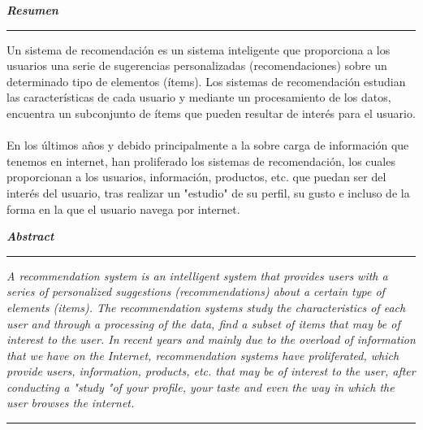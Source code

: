 \documentclass[11pt,a4paper]{article}
\begin{document}
		\textbf{\textit{\large Resumen}}\rule[1.5mm]{5mm}{0.1mm}		
		Un sistema de recomendación es un sistema inteligente que proporciona a los usuarios una serie de sugerencias personalizadas (recomendaciones) sobre un determinado tipo de elementos (ítems). Los sistemas de recomendación estudian las características de cada usuario y mediante un procesamiento de los datos, encuentra un subconjunto de ítems que pueden resultar de interés para el usuario.\\
		\\
		En los últimos años y debido principalmente a la sobre carga de información que tenemos en internet, han proliferado los sistemas de recomendación, los cuales proporcionan a los usuarios, información, productos, etc. que puedan ser del interés del usuario, tras realizar un "estudio" de su perfil, su gusto e incluso de la forma en la que el usuario navega por internet.
				
		\vspace{\baselineskip}
		
		\textbf{\textit{\large Abstract}}\rule[1.5mm]{5mm}{0.1mm} 		
		\textit{
			A recommendation system is an intelligent system that provides users with a series of personalized suggestions (recommendations) about a certain type of elements (items). The recommendation systems study the characteristics of each user and through a processing of the data, find a subset of items that may be of interest to the user.
			In recent years and mainly due to the overload of information that we have on the Internet, recommendation systems have proliferated, which provide users, information, products, etc. that may be of interest to the user, after conducting a "study "of your profile, your taste and even the way in which the user browses the internet.			
		 }				
						
		\rule{167mm}{0.1mm}
		
		\vspace{\baselineskip}
		
\end{document}
